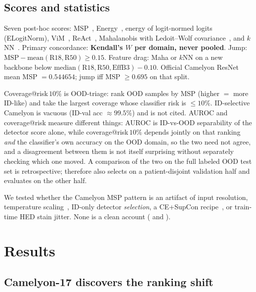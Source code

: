 \documentclass[anon]{midl}
\begin{document}
\subsection{Scores and statistics}

Seven post-hoc scores: MSP~\cite{hendrycks2017baseline}, Energy~\cite{liu2020energy}, energy of logit-normed logits (ELogitNorm), ViM~\cite{wang2022vim}, ReAct~\cite{sun2021react}, Mahalanobis with Ledoit--Wolf covariance~\cite{lee2018mahalanobis,ledoit2004well}, and $k$NN~\cite{sun2022knn}.
Primary concordance: \textbf{Kendall's $W$ per domain, never pooled}.
Jump: $\mathrm{MSP}-\mathrm{mean}(\mathrm{R18},\mathrm{R50})\ge 0.15$.
Feature drag: Maha or $k$NN on a new backbone below $\mathrm{median}(\mathrm{R18},\mathrm{R50},\mathrm{EffB3})-0.10$.
Official Camelyon ResNet mean MSP ${=}0.544654$; jump iff MSP ${\ge}0.695$ on that split.

Coverage@risk\,$10\%$ is OOD-triage: rank OOD samples by MSP (higher ${=}$ more ID-like) and take the largest coverage whose classifier risk is ${\le}10\%$.
ID-selective Camelyon is vacuous (ID-val acc ${\approx}99.5\%$) and is not cited.
AUROC and coverage@risk measure different things: AUROC is ID-vs-OOD separability of the detector score alone, while coverage@risk\,$10\%$ depends jointly on that ranking \emph{and} the classifier's own accuracy on the OOD domain, so the two need not agree, and a disagreement between them is not itself surprising without separately checking which one moved.
A comparison of the two on the full labeled OOD test set is retrospective;  therefore also selects on a patient-disjoint validation half and evaluates on the other half.

We tested whether the Camelyon MSP pattern is an artifact of input resolution, temperature scaling~\cite{guo2017calibration}, ID-only detector \emph{selection}, a CE{+}SupCon recipe~\cite{khosla2020supcon}, or train-time HED stain jitter.
None is a clean account ( and ).

\section{Results}

\subsection{Camelyon-17 discovers the ranking shift}
\label{sec:camelyon}
\end{document}
